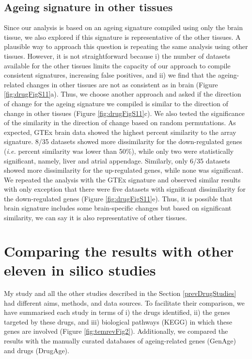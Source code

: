 \documentclass[12pt,twoside]{unicam}
\begin{document}
\hypertarget{ageing-signature-in-other-tissues}{%
\subsection{Ageing signature in other tissues}\label{ageing-signature-in-other-tissues}}

Since our analysis is based on an ageing signature compiled using only the brain tissue, we also explored if this signature is representative of the other tissues. A plausible way to approach this question is repeating the same analysis using other tissues. However, it is not straightforward because i) the number of datasets available for the other tissues limits the capacity of our approach to compile consistent signatures, increasing false positives, and ii) we find that the ageing-related changes in other tissues are not as consistent as in brain (Figure \ref{fig:drugFigS11}a). Thus, we choose another approach and asked if the direction of change for the ageing signature we compiled is similar to the direction of change in other tissues (Figure \ref{fig:drugFigS11}c). We also tested the significance of the similarity in the direction of change based on random permutations. As expected, GTEx brain data showed the highest percent similarity to the array signature. 8/35 datasets showed more dissimilarity for the down-regulated genes (\emph{i.e.} percent similarity was lower than 50\%), while only two were statistically significant, namely, liver and atrial appendage. Similarly, only 6/35 datasets showed more dissimilarity for the up-regulated genes, while none was significant. We repeated the analysis with the GTEx signature and observed similar results with only exception that there were five datasets with significant dissimilarity for the down-regulated genes (Figure \ref{fig:drugFigS11}e). Thus, it is possible that brain signature includes some brain-specific changes but based on significant similarity, we can say it is also representative of other tissues.

\hypertarget{comparing-the-results-with-other-eleven-in-silico-studies}{%
\section{Comparing the results with other eleven in silico studies}\label{comparing-the-results-with-other-eleven-in-silico-studies}}

My study and all the other studies described in the Section \ref{prevDrugStudies} had different aims, methods, and data sources. To facilitate their comparison, we have summarised each study in terms of i) the drugs identified, ii) the genes targeted by these drugs, and iii) biological pathways (KEGG) in which these genes are involved (Figure \ref{fig:temrevFig2}). Additionally, we compared the results with the manually curated databases of ageing-related genes (GenAge) and drugs (DrugAge).
\end{document}
